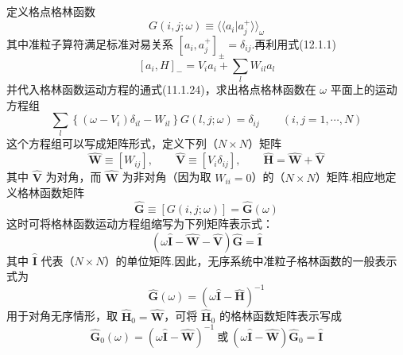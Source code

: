 定义格点格林函数
\begin{equation}
  G\left(i,j;\omega\right)\equiv\langle\langle a_{i}|a_{j}^{+}\rangle\rangle_{\omega}
\end{equation}
其中准粒子算符满足标准对易关系 $\left[a_{i},a_{j}^{+}\right]_{\pm}=\delta_{ij}$.再利用式(12.1.1)
\begin{equation}
  \left[a_{i},H\right]_{-}=V_{i}a_{i}+\sum_{l}W_{il}a_{l}
\end{equation}
并代入格林函数运动方程的通式(11.1.24)，求出格点格林函数在 $\omega$ 平面上的运动方程组
\begin{equation}
  \sum_{l}\left\{\left(\omega-V_{i}\right)\delta_{il}-W_{il}\right\}G\left(l,j;\omega\right)=\delta_{ij}
  \qquad\left(i,j=1,\cdots,N\right)
\end{equation}
这个方程组可以写成矩阵形式，定义下列（$N\times N$）矩阵
\begin{equation}
  \hat{\boldsymbol{W}}\equiv\left[W_{ij}\right],\qquad
  \hat{\boldsymbol{V}}\equiv\left[V_{i}\delta_{ij}\right],\qquad
  \hat{\boldsymbol{H}}=\hat{\boldsymbol{W}}+\hat{\boldsymbol{V}}
\end{equation}
其中 $\hat{\boldsymbol{V}}$ 为对角，而 $\hat{\boldsymbol{W}}$ 为非对角（因为取 $W_{ii}=0$）的（$N\times N$）矩阵.相应地定义格林函数矩阵
\begin{equation}
  \hat{\boldsymbol{G}}\equiv\left[G\left(i,j;\omega\right)\right]=\hat{\boldsymbol{G}}\left(\omega\right)
\end{equation}
这时可将格林函数运动方程组缩写为下列矩阵表示式：
\begin{equation}
  \left(\omega\hat{\boldsymbol{I}}-\hat{\boldsymbol{W}}-\hat{\boldsymbol{V}}\right)\hat{\boldsymbol{G}}=\hat{\boldsymbol{I}}
\end{equation}
其中 $\hat{\boldsymbol{I}}$ 代表（$N\times N$）的单位矩阵.因此，无序系统中准粒子格林函数的一般表示式为
\begin{equation}
  \hat{\boldsymbol{G}}\left(\omega\right)=\left(\omega\hat{\boldsymbol{I}}-\hat{\boldsymbol{H}}\right)^{-1}
\end{equation}
用于对角无序情形，取 $\hat{\boldsymbol{H}}_{0}=\hat{\boldsymbol{W}}$，可将 $\hat{\boldsymbol{H}}_{0}$ 的格林函数矩阵表示写成
\begin{equation}
  \hat{\boldsymbol{G}}_{0}\left(\omega\right)=\left(\omega\hat{\boldsymbol{I}}-\hat{\boldsymbol{W}}\right)^{-1}
  \ \text{或}\
  \left(\omega\hat{\boldsymbol{I}}-\hat{\boldsymbol{W}}\right)\hat{\boldsymbol{G}}_{0}=\hat{\boldsymbol{I}}
\end{equation}
